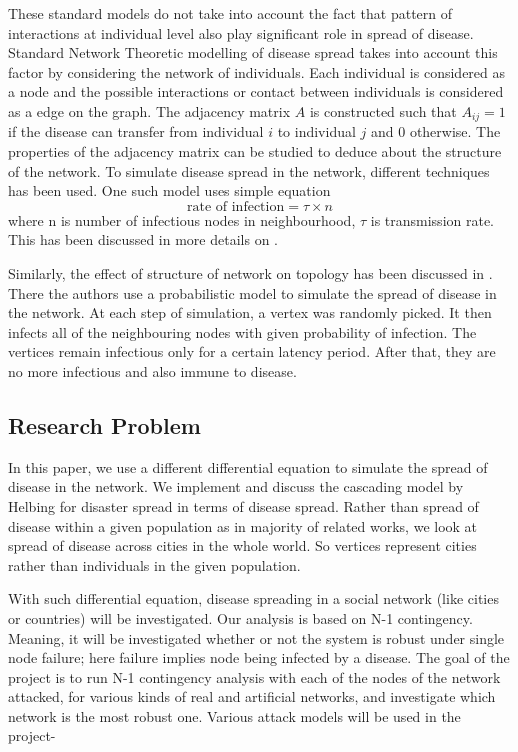 \documentclass[11pt]{article}
\begin{document}
These standard models do not take into account the fact that pattern of interactions at individual level also play significant role in spread of disease. Standard Network Theoretic modelling of disease spread takes into account this factor by considering the network of individuals. Each individual is considered as a node and the possible interactions or contact between individuals is considered as a edge on the graph. The adjacency matrix $A$ is constructed such that $A_{ij} = 1$ if the disease can transfer from individual $i$ to individual $j$ and $0$ otherwise. The properties of the adjacency matrix can be studied to deduce about the structure of the network. To simulate disease spread in the network, different techniques has been used. One such model uses simple equation
\[ \text {rate of infection} = \tau \times n \] where n is number of infectious nodes in neighbourhood, $\tau$ is transmission rate. This has been discussed in more details on \cite{keeling}.

Similarly, the effect of structure of network on topology has been discussed in \cite{shirley}. There the authors use a probabilistic model to simulate the spread of disease in the network. At each step of simulation, a vertex was randomly picked. It then infects all of the neighbouring nodes with given probability of infection. The vertices remain infectious only for a certain latency period. After that, they are no more infectious and also immune to disease.

\subsection{Research Problem}
In this paper, we use a different differential equation to simulate the spread of disease in the network. We implement and discuss the cascading model by Helbing for disaster spread in terms of disease spread. Rather than spread of disease within a given population as in majority of related works, we look at spread of disease across cities in the whole world. So vertices represent cities rather than individuals in the given population.

With such differential equation, disease spreading in a social network (like cities or countries) will be investigated.  Our analysis is based on N-1 contingency. Meaning, it will be investigated whether or not the system is robust under single node failure; here failure implies node being infected by a disease. The goal of the project is to run N-1 contingency analysis with each of the nodes of the network attacked, for various kinds of real and artificial networks, and investigate which network is the most robust one. Various attack models will be used in the project- 
\end{document}
